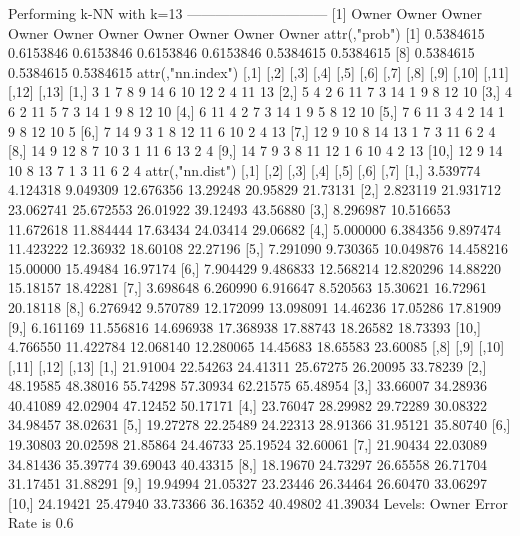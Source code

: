 \documentclass{article}
\begin{document}
\begin{Schunk}
\begin{Soutput}
Performing k-NN with k=13
 ------------------------------
 [1] Owner Owner Owner Owner Owner Owner Owner Owner Owner Owner
attr(,"prob")
 [1] 0.5384615 0.6153846 0.6153846 0.6153846 0.6153846 0.5384615 0.5384615
 [8] 0.5384615 0.5384615 0.5384615
attr(,"nn.index")
      [,1] [,2] [,3] [,4] [,5] [,6] [,7] [,8] [,9] [,10] [,11] [,12] [,13]
 [1,]    3    1    7    8    9   14    6   10   12     2     4    11    13
 [2,]    5    4    2    6   11    7    3   14    1     9     8    12    10
 [3,]    4    6    2   11    5    7    3   14    1     9     8    12    10
 [4,]    6   11    4    2    7    3   14    1    9     5     8    12    10
 [5,]    7    6   11    3    4    2   14    1    9     8    12    10     5
 [6,]    7   14    9    3    1    8   12   11    6    10     2     4    13
 [7,]   12    9   10    8   14   13    1    7    3    11     6     2     4
 [8,]   14    9   12    8    7   10    3    1   11     6    13     2     4
 [9,]   14    7    9    3    8   11   12    1    6    10     4     2    13
[10,]   12    9   14   10    8   13    7    1    3    11     6     2     4
attr(,"nn.dist")
          [,1]      [,2]      [,3]      [,4]     [,5]     [,6]     [,7]
 [1,] 3.539774  4.124318  9.049309 12.676356 13.29248 20.95829 21.73131
 [2,] 2.823119 21.931712 23.062741 25.672553 26.01922 39.12493 43.56880
 [3,] 8.296987 10.516653 11.672618 11.884444 17.63434 24.03414 29.06682
 [4,] 5.000000  6.384356  9.897474 11.423222 12.36932 18.60108 22.27196
 [5,] 7.291090  9.730365 10.049876 14.458216 15.00000 15.49484 16.97174
 [6,] 7.904429  9.486833 12.568214 12.820296 14.88220 15.18157 18.42281
 [7,] 3.698648  6.260990  6.916647  8.520563 15.30621 16.72961 20.18118
 [8,] 6.276942  9.570789 12.172099 13.098091 14.46236 17.05286 17.81909
 [9,] 6.161169 11.556816 14.696938 17.368938 17.88743 18.26582 18.73393
[10,] 4.766550 11.422784 12.068140 12.280065 14.45683 18.65583 23.60085
          [,8]     [,9]    [,10]    [,11]    [,12]    [,13]
 [1,] 21.91004 22.54263 24.41311 25.67275 26.20095 33.78239
 [2,] 48.19585 48.38016 55.74298 57.30934 62.21575 65.48954
 [3,] 33.66007 34.28936 40.41089 42.02904 47.12452 50.17171
 [4,] 23.76047 28.29982 29.72289 30.08322 34.98457 38.02631
 [5,] 19.27278 22.25489 24.22313 28.91366 31.95121 35.80740
 [6,] 19.30803 20.02598 21.85864 24.46733 25.19524 32.60061
 [7,] 21.90434 22.03089 34.81436 35.39774 39.69043 40.43315
 [8,] 18.19670 24.73297 26.65558 26.71704 31.17451 31.88291
 [9,] 19.94994 21.05327 23.23446 26.34464 26.60470 33.06297
[10,] 24.19421 25.47940 33.73366 36.16352 40.49802 41.39034
Levels: Owner
Error Rate is  0.6


\end{Soutput}
\end{Schunk}
\end{document}
